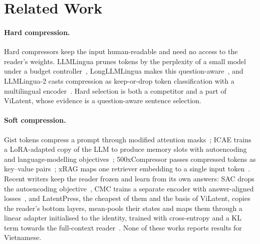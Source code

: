 \section{Related Work}
\label{sec:related}

\paragraph{Hard compression.}
Hard compressors keep the input human-readable and need no access to the reader's weights.
LLMLingua prunes tokens by the perplexity of a small model under a budget controller~\cite{jiang2023llmlingua}, LongLLMLingua makes this question-aware~\cite{jiang2024longllmlingua}, and LLMLingua-2 casts compression as keep-or-drop token classification with a multilingual encoder~\cite{pan2024llmlingua2}.
Hard selection is both a competitor and a part of ViLatent, whose evidence is a question-aware sentence selection.

\paragraph{Soft compression.}
Gist tokens compress a prompt through modified attention masks~\cite{mu2023gist}; ICAE trains a LoRA-adapted copy of the LLM to produce memory slots with autoencoding and language-modelling objectives~\cite{ge2024icae}; 500xCompressor passes compressed tokens as key--value pairs~\cite{li2024_500x}; xRAG maps one retriever embedding to a single input token~\cite{cheng2024xrag}.
Recent writers keep the reader frozen and learn from its own answers: SAC drops the autoencoding objective~\cite{liu2025sac}, CMC trains a separate encoder with answer-aligned losses~\cite{rahman2026cmc}, and LatentPress, the cheapest of them and the basis of ViLatent, copies the reader's bottom layers, mean-pools their states and maps them through a linear adapter initialised to the identity, trained with cross-entropy and a KL term towards the full-context reader~\cite{xu2026latentpress}.
None of these works reports results for Vietnamese.

